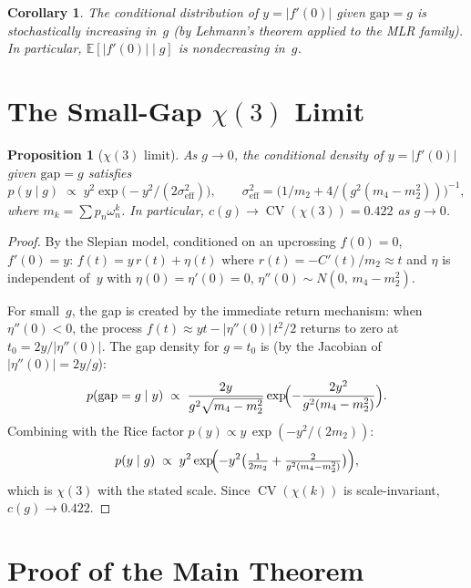 \documentclass[11pt]{article}
\newtheorem{proposition}[theorem]{Proposition}
\newtheorem{corollary}[theorem]{Corollary}
\DeclareMathOperator{\CV}{CV}
\begin{document}
\begin{corollary}\label{cor:mlr}
The conditional distribution of $y = |f'(0)|$ given $\mathrm{gap} = g$ is
stochastically increasing in~$g$ (by Lehmann's theorem applied to the
MLR family).
In particular, $\mathbb{E}[|f'(0)| \mid g]$ is nondecreasing in~$g$.
\end{corollary}


\section{The Small-Gap $\chi(3)$ Limit}\label{sec:chi3}

\begin{proposition}[$\chi(3)$ limit]\label{prop:chi3}
As $g \to 0$, the conditional density of $y = |f'(0)|$ given
$\mathrm{gap} = g$ satisfies
\[
p(y \mid g) \;\propto\; y^2 \exp\!\bigl(-y^2/(2\sigma_{\mathrm{eff}}^2)\bigr),
\qquad
\sigma_{\mathrm{eff}}^2 = \bigl(1/m_2 + 4/(g^2(m_4 - m_2^2))\bigr)^{-1},
\]
where $m_k = \sum p_n \omega_n^k$.
In particular, $c(g) \to \CV(\chi(3)) = 0.422$ as $g \to 0$.
\end{proposition}

\begin{proof}
By the Slepian model, conditioned on an upcrossing $f(0) = 0$, $f'(0) = y$:
$f(t) = y\,r(t) + \eta(t)$ where $r(t) = -C'(t)/m_2 \approx t$
and $\eta$ is independent of~$y$ with $\eta(0) = \eta'(0) = 0$,
$\eta''(0) \sim N(0,\, m_4 - m_2^2)$.

For small~$g$, the gap is created by the immediate return mechanism:
when $\eta''(0) < 0$, the process $f(t) \approx yt - |\eta''(0)|\,t^2/2$
returns to zero at $t_0 = 2y/|\eta''(0)|$.
The gap density for $g = t_0$ is (by the Jacobian of $|\eta''(0)| = 2y/g$):
\[
p(\mathrm{gap} = g \mid y) \;\propto\;
\frac{2y}{g^2\sqrt{m_4 - m_2^2}}
\exp\!\Bigl(-\frac{2y^2}{g^2(m_4 - m_2^2)}\Bigr).
\]
Combining with the Rice factor $p(y) \propto y\,\exp(-y^2/(2m_2))$:
\[
p(y \mid g) \;\propto\;
y^2 \exp\!\Bigl(-y^2\bigl(\tfrac{1}{2m_2} + \tfrac{2}{g^2(m_4{-}m_2^2)}\bigr)\Bigr),
\]
which is $\chi(3)$ with the stated scale.
Since $\CV(\chi(k))$ is scale-invariant, $c(g) \to 0.422$.
\end{proof}


\section{Proof of the Main Theorem}\label{sec:proof}
\end{document}
